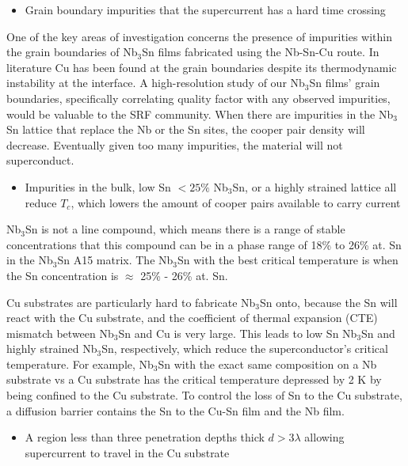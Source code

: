         \begin{itemize}
            \item Grain boundary impurities that the supercurrent has a hard time crossing
        \end{itemize}
        
        One of the key areas of investigation concerns the presence of impurities within the grain boundaries of Nb$_3$Sn films fabricated using the Nb-Sn-Cu route. In literature \cite{Tarantini:2021cum} Cu has been found at the grain boundaries despite its thermodynamic instability at the interface. A high-resolution study of our Nb$_3$Sn films' grain boundaries, specifically correlating quality factor with any observed impurities, would be valuable to the SRF community. When there are impurities in the Nb$_3$Sn lattice that replace the Nb or the Sn sites, the cooper pair density will decrease. Eventually given too many impurities, the material will not superconduct.
        
        \begin{itemize}
            \item Impurities in the bulk, low Sn $ < 25\%$ Nb$_3$Sn, or a highly strained lattice all reduce $T_c$, which lowers the amount of cooper pairs available to carry current
        \end{itemize}
        
        Nb$_3$Sn is not a line compound, which means there is a range of stable concentrations that this compound can be in a phase range of 18\% to 26\% at. Sn in the Nb$_3$Sn A15 matrix. The Nb$_3$Sn with the best critical temperature is when the Sn concentration is $\approx$ 25\% - 26\% at. Sn. 
        
        Cu substrates are particularly hard to fabricate Nb$_3$Sn onto, because the Sn will react with the Cu substrate, and the coefficient of thermal expansion (CTE) mismatch between Nb$_3$Sn and Cu is very large. This leads to low Sn Nb$_3$Sn and highly strained Nb$_3$Sn, respectively, which reduce the superconductor's critical temperature. For example, Nb$_3$Sn with the exact same composition on a Nb substrate vs a Cu substrate has the critical temperature depressed by 2 K by being confined to the Cu substrate. To control the loss of Sn to the Cu substrate, a diffusion barrier contains the Sn to the Cu-Sn film and the Nb film.
        
        \begin{itemize}
            \item A region less than three penetration depths thick $d > 3\lambda$ allowing supercurrent to travel in the Cu substrate
        \end{itemize}
        
